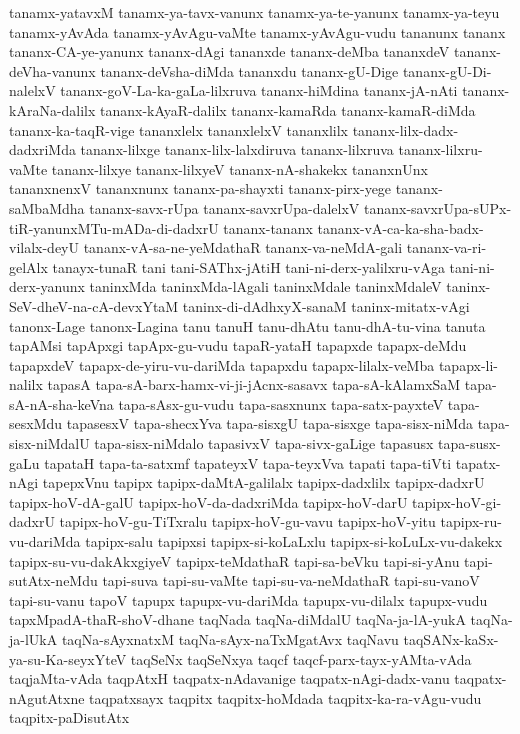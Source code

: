 {tanamx-yatavxM
tanamx-ya-tavx-vanunx
tanamx-ya-te-yanunx
tanamx-ya-teyu
tanamx-yAvAda
tanamx-yAvAgu-vaMte
tanamx-yAvAgu-vudu
tananunx
tananx
tananx-CA-ye-yanunx
tananx-dAgi
tananxde
tananx-deMba
tananxdeV
tananx-deVha-vanunx
tananx-deVsha-diMda
tananxdu
tananx-gU-Dige
tananx-gU-Di-nalelxV
tananx-goV-La-ka-gaLa-lilxruva
tananx-hiMdina
tananx-jA-nAti
tananx-kAraNa-dalilx
tananx-kAyaR-dalilx
tananx-kamaRda
tananx-kamaR-diMda
tananx-ka-taqR-vige
tananxlelx
tananxlelxV
tananxlilx
tananx-lilx-dadx-dadxriMda
tananx-lilxge
tananx-lilx-lalxdiruva
tananx-lilxruva
tananx-lilxru-vaMte
tananx-lilxye
tananx-lilxyeV
tananx-nA-shakekx
tananxnUnx
tananxnenxV
tananxnunx
tananx-pa-shayxti
tananx-pirx-yege
tananx-saMbaMdha
tananx-savx-rUpa
tananx-savxrUpa-dalelxV
tananx-savxrUpa-sUPx-tiR-yanunxMTu-mADa-di-dadxrU
tananx-tananx
tananx-vA-ca-ka-sha-badx-vilalx-deyU
tananx-vA-sa-ne-yeMdathaR
tananx-va-neMdA-gali
tananx-va-ri-gelAlx
tanayx-tunaR
tani
tani-SAThx-jAtiH
tani-ni-derx-yalilxru-vAga
tani-ni-derx-yanunx
taninxMda
taninxMda-lAgali
taninxMdale
taninxMdaleV
taninx-SeV-dheV-na-cA-devxYtaM
taninx-di-dAdhxyX-sanaM
taninx-mitatx-vAgi
tanonx-Lage
tanonx-Lagina
tanu
tanuH
tanu-dhAtu
tanu-dhA-tu-vina
tanuta
tapAMsi
tapApxgi
tapApx-gu-vudu
tapaR-yataH
tapapxde
tapapx-deMdu
tapapxdeV
tapapx-de-yiru-vu-dariMda
tapapxdu
tapapx-lilalx-veMba
tapapx-li-nalilx
tapasA
tapa-sA-barx-hamx-vi-ji-jAcnx-sasavx
tapa-sA-kAlamxSaM
tapa-sA-nA-sha-keVna
tapa-sAsx-gu-vudu
tapa-sasxnunx
tapa-satx-payxteV
tapa-sesxMdu
tapasesxV
tapa-shecxYva
tapa-sisxgU
tapa-sisxge
tapa-sisx-niMda
tapa-sisx-niMdalU
tapa-sisx-niMdalo
tapasivxV
tapa-sivx-gaLige
tapasusx
tapa-susx-gaLu
tapataH
tapa-ta-satxmf
tapateyxV
tapa-teyxVva
tapati
tapa-tiVti
tapatx-nAgi
tapepxVnu
tapipx
tapipx-daMtA-galilalx
tapipx-dadxlilx
tapipx-dadxrU
tapipx-hoV-dA-galU
tapipx-hoV-da-dadxriMda
tapipx-hoV-darU
tapipx-hoV-gi-dadxrU
tapipx-hoV-gu-TiTxralu
tapipx-hoV-gu-vavu
tapipx-hoV-yitu
tapipx-ru-vu-dariMda
tapipx-salu
tapipxsi
tapipx-si-koLaLxlu
tapipx-si-koLuLx-vu-dakekx
tapipx-su-vu-dakAkxgiyeV
tapipx-teMdathaR
tapi-sa-beVku
tapi-si-yAnu
tapi-sutAtx-neMdu
tapi-suva
tapi-su-vaMte
tapi-su-va-neMdathaR
tapi-su-vanoV
tapi-su-vanu
tapoV
tapupx
tapupx-vu-dariMda
tapupx-vu-dilalx
tapupx-vudu
tapxMpadA-thaR-shoV-dhane
taqNada
taqNa-diMdalU
taqNa-ja-lA-yukA
taqNa-ja-lUkA
taqNa-sAyxnatxM
taqNa-sAyx-naTxMgatAvx
taqNavu
taqSANx-kaSx-ya-su-Ka-seyxYteV
taqSeNx
taqSeNxya
taqcf
taqcf-parx-tayx-yAMta-vAda
taqjaMta-vAda
taqpAtxH
taqpatx-nAdavanige
taqpatx-nAgi-dadx-vanu
taqpatx-nAgutAtxne
taqpatxsayx
taqpitx
taqpitx-hoMdada
taqpitx-ka-ra-vAgu-vudu
taqpitx-paDisutAtx
}
